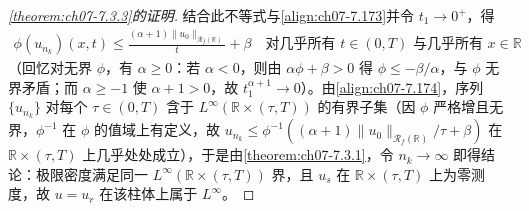 \documentclass[../../main.tex]{subfiles}%
\begin{document}
\begin{proof}[\cref{theorem:ch07-7.3.3}的证明]
结合此不等式与\eqref{align:ch07-7.173}并令 $t_1\to0^+$，得
\begin{align}
\phi(u_{n_k})(x,t)\leqslant\frac{(\alpha+1)\|u_0\|_{\mathscr{R}_f(\mathbb{R})}}{t}+\beta
\quad\text{对几乎所有 }t\in(0,T)\text{ 与几乎所有 }x\in\mathbb{R} \label{align:ch07-7.174}
\end{align}
（回忆对无界 $\phi$，有 $\alpha\geqslant0$：若 $\alpha<0$，则由 $\alpha\phi+\beta>0$ 得 $\phi\leqslant-\beta/\alpha$，与 $\phi$ 无界矛盾；而 $\alpha\geqslant-1$ 使 $\alpha+1>0$，故 $t_1^{\alpha+1}\to0$）。由\eqref{align:ch07-7.174}，序列 $\{u_{n_k}\}$ 对每个 $\tau\in(0,T)$ 含于 $L^\infty(\mathbb{R}\times(\tau,T))$ 的有界子集（因 $\phi$ 严格增且无界，$\phi^{-1}$ 在 $\phi$ 的值域上有定义，故 $u_{n_k}\leqslant\phi^{-1}((\alpha+1)\|u_0\|_{\mathscr{R}_f(\mathbb{R})}/\tau+\beta)$ 在 $\mathbb{R}\times(\tau,T)$ 上几乎处处成立），于是由\cref{theorem:ch07-7.3.1}，令 $n_k\to\infty$ 即得结论：极限密度满足同一 $L^\infty(\mathbb{R}\times(\tau,T))$ 界，且 $u_s$ 在 $\mathbb{R}\times(\tau,T)$ 上为零测度，故 $u=u_r$ 在该柱体上属于 $L^\infty$。
\end{proof}
\end{document}

